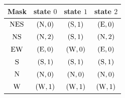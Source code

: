 \begin{center}
\small
\begin{tabular}{@{}c|ccc@{}}
\toprule
Mask & state $0$ & state $1$ & state $2$\\
\midrule
$\mathrm{N}\mathrm{E}\mathrm{S}$ & $(\mathrm{N},0)$ & $(\mathrm{S},1)$ & $(\mathrm{E},0)$\\
$\mathrm{N}\mathrm{S}$ & $(\mathrm{N},2)$ & $(\mathrm{S},1)$ & $(\mathrm{N},2)$\\
$\mathrm{E}\mathrm{W}$ & $(\mathrm{E},0)$ & $(\mathrm{W},0)$ & $(\mathrm{E},0)$\\
$\mathrm{S}$ & $(\mathrm{S},1)$ & $(\mathrm{S},1)$ & $(\mathrm{S},1)$\\
$\mathrm{N}$ & $(\mathrm{N},0)$ & $(\mathrm{N},0)$ & $(\mathrm{N},0)$\\
$\mathrm{W}$ & $(\mathrm{W},1)$ & $(\mathrm{W},1)$ & $(\mathrm{W},1)$\\
\bottomrule
\end{tabular}
\end{center}

